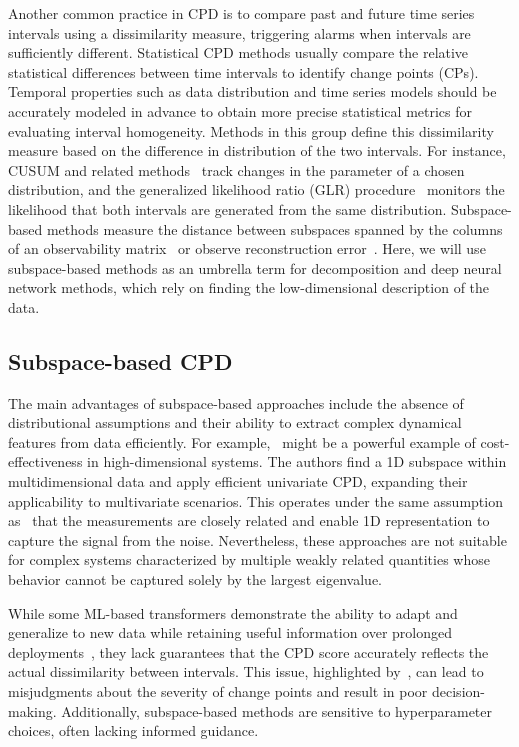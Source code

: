 Another common practice in CPD is to compare past and future time series intervals using a dissimilarity measure, triggering alarms when intervals are sufficiently different. Statistical CPD methods usually compare the relative statistical differences between time intervals to identify change points (CPs). Temporal properties such as data distribution and time series models should be accurately modeled in advance to obtain more precise statistical metrics for evaluating interval homogeneity. Methods in this group define this dissimilarity measure based on the difference in distribution of the two intervals. For instance, CUSUM and related methods~\cite{Ye2023} track changes in the parameter of a chosen distribution, and the generalized likelihood ratio (GLR) procedure~\cite{Xie2013, Korycki2021} monitors the likelihood that both intervals are generated from the same distribution. Subspace-based methods measure the distance between subspaces spanned by the columns of an observability matrix~\cite{Moskvina2003, Kawahara2007} or observe reconstruction error~\cite{DeRyck2021, Bao2024}. Here, we will use subspace-based methods as an umbrella term for decomposition and deep neural network methods, which rely on finding the low-dimensional description of the data.  %

\subsection{Subspace-based CPD}\label{sec:subspace-based-cpd}
The main advantages of subspace-based approaches include the absence of distributional assumptions and their ability to extract complex dynamical features from data efficiently. For example,~\cite{Hirabaru2016} might be a powerful example of cost-effectiveness in high-dimensional systems. The authors find a 1D subspace within multidimensional data and apply efficient univariate CPD, expanding their applicability to multivariate scenarios. This operates under the same assumption as~\cite{Fathy2019} that the measurements are closely related and enable 1D representation to capture the signal from the noise. Nevertheless, these approaches are not suitable for complex systems characterized by multiple weakly related quantities whose behavior cannot be captured solely by the largest eigenvalue.

While some ML-based transformers demonstrate the ability to adapt and generalize to new data while retaining useful information over prolonged deployments~\cite{Corizzo2022}, they lack guarantees that the CPD score accurately reflects the actual dissimilarity between intervals. This issue, highlighted by~\cite{DeRyck2021}, can lead to misjudgments about the severity of change points and result in poor decision-making. Additionally, subspace-based methods are sensitive to hyperparameter choices, often lacking informed guidance.

